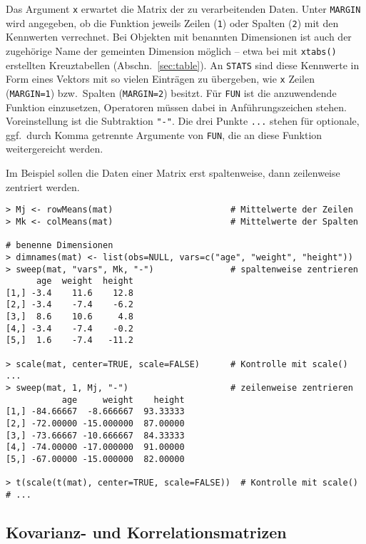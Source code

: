Das Argument \lstinline!x! erwartet die Matrix der zu verarbeitenden Daten. Unter \lstinline!MARGIN! wird angegeben, ob die Funktion jeweils Zeilen (\lstinline!1!) oder Spalten (\lstinline!2!) mit den Kennwerten verrechnet. Bei Objekten mit benannten Dimensionen ist auch der zugehörige Name der gemeinten Dimension möglich -- etwa bei mit \lstinline!xtabs()! erstellten Kreuztabellen (Abschn.\ \ref{sec:table}). An \lstinline!STATS! sind diese Kennwerte in Form eines Vektors mit so vielen Einträgen zu übergeben, wie \lstinline!x! Zeilen (\lstinline!MARGIN=1!) bzw.\ Spalten (\lstinline!MARGIN=2!) besitzt. Für \lstinline!FUN! ist die anzuwendende Funktion einzusetzen, Operatoren müssen dabei in Anführungszeichen stehen. Voreinstellung ist die Subtraktion \lstinline!"-"!. Die drei Punkte \lstinline!...! stehen für optionale, ggf.\ durch Komma getrennte Argumente von \lstinline!FUN!, die an diese Funktion weitergereicht werden.

Im Beispiel sollen die Daten einer Matrix erst spaltenweise, dann zeilenweise zentriert werden.
\begin{lstlisting}
> Mj <- rowMeans(mat)                       # Mittelwerte der Zeilen
> Mk <- colMeans(mat)                       # Mittelwerte der Spalten

# benenne Dimensionen
> dimnames(mat) <- list(obs=NULL, vars=c("age", "weight", "height"))
> sweep(mat, "vars", Mk, "-")               # spaltenweise zentrieren
      age  weight  height
[1,] -3.4    11.6    12.8
[2,] -3.4    -7.4    -6.2
[3,]  8.6    10.6     4.8
[4,] -3.4    -7.4    -0.2
[5,]  1.6    -7.4   -11.2

> scale(mat, center=TRUE, scale=FALSE)      # Kontrolle mit scale() ...
> sweep(mat, 1, Mj, "-")                    # zeilenweise zentrieren
           age     weight    height
[1,] -84.66667  -8.666667  93.33333
[2,] -72.00000 -15.000000  87.00000
[3,] -73.66667 -10.666667  84.33333
[4,] -74.00000 -17.000000  91.00000
[5,] -67.00000 -15.000000  82.00000

> t(scale(t(mat), center=TRUE, scale=FALSE))  # Kontrolle mit scale()
# ...
\end{lstlisting}

\subsection{Kovarianz- und Korrelationsmatrizen}
\label{sec:covMat}

